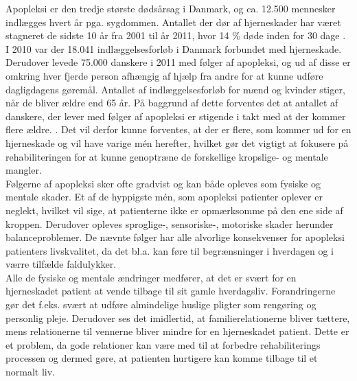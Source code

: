 Apopleksi er den tredje største dødsårsag i Danmark, og ca. 12.500 mennesker indlægges hvert år pga. sygdommen\cite{Hjernesagen2015a}. Antallet der dør af hjerneskader har været stagneret de sidste 10 år fra 2001 til år 2011, hvor 14 \% døde inden for 30 dage \cite{Hjernesagen2015}. I 2010 var der 18.041 indlæggelsesforløb i Danmark forbundet med hjerneskade\cite{Sundhedsstyrelsen2011}. Derudover levede 75.000 danskere i 2011 med følger af apopleksi, og ud af disse er omkring hver fjerde person afhængig af hjælp fra andre for at kunne udføre dagligdagens gøremål\cite{Hjernesagen2015a}. Antallet af indlæggelsesforløb for mænd og kvinder stiger, når de bliver ældre end 65 år\cite{Sundhedsstyrelsen2011}.
På baggrund af dette forventes det at antallet af danskere, der lever med følger af apopleksi er stigende i takt med at der kommer flere ældre. \cite{Sagen2014}. 
Det vil derfor kunne forventes, at der er flere, som kommer ud for en hjerneskade og vil have varige mén herefter, hvilket gør det vigtigt at fokusere på rehabiliteringen for at kunne genoptræne de forskellige kropslige- og mentale mangler. \\
Følgerne af apopleksi sker ofte gradvist og kan både opleves som fysiske og mentale skader\cite{Muus2008}. Et af de hyppigste mén, som apopleksi patienter oplever er neglekt, hvilket vil sige, at patienterne ikke er opmærksomme på den ene side af kroppen\cite{Sundhed.dk}. Derudover opleves sproglige-, sensoriske-, motoriske skader herunder balanceproblemer. De nævnte følger har alle alvorlige konsekvenser for apopleksi patienters livskvalitet, da det bl.a. kan føre til  begrænsninger i hverdagen og i værre tilfælde faldulykker.\cite{Nichols1997, Muus2008} \\
Alle de fysiske og mentale ændringer medfører, at det er svært for en hjerneskadet patient at vende tilbage til sit gamle hverdagsliv. Forandringerne gør det f.eks. svært at udføre almindelige huslige pligter som rengøring og personlig pleje. Derudover ses det imidlertid, at familierelationerne bliver tættere, mens relationerne til vennerne bliver mindre for en hjerneskadet patient. Dette er et problem, da gode relationer kan være med til at forbedre rehabiliterings processen og dermed gøre, at patienten hurtigere kan komme tilbage til et normalt liv.\cite{Sundhedsstyrelsen2010} \\
